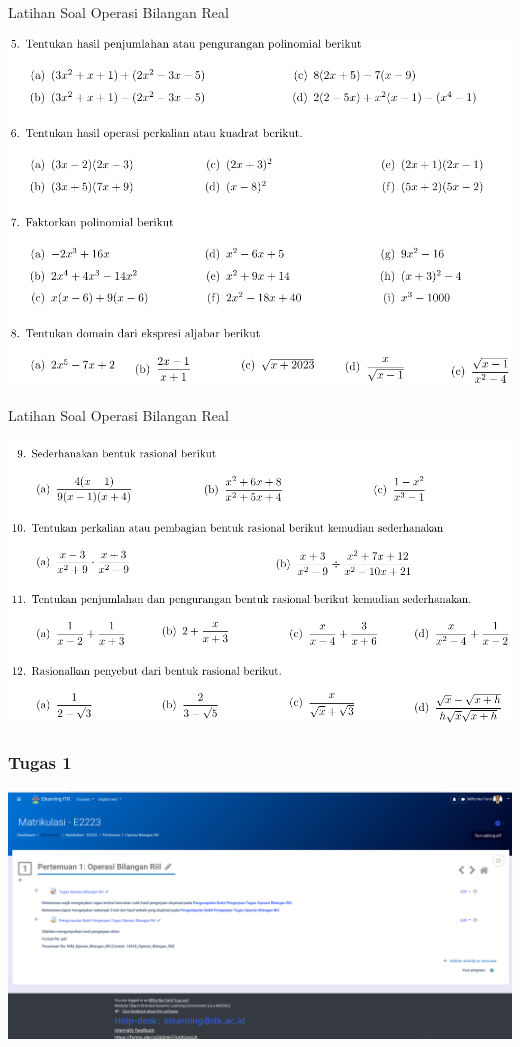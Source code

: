 \documentclass[pdflatex,compress,mathserif]{beamer}
\begin{document}
\begin{frame}{Latihan Soal Operasi Bilangan Real}
	\begin{center}
		\includegraphics[width=0.8\linewidth]{img/img45}
	\end{center}
\end{frame}

\begin{frame}{Latihan Soal Operasi Bilangan Real}
	\begin{center}
		\includegraphics[width=0.8\linewidth]{img/img46}
	\end{center}
\end{frame}

\begin{frame}
	\frametitle{Tugas 1}
	\begin{center}
		\includegraphics[width=\linewidth]{img/img47}
	\end{center}
\end{frame}
\end{document}
